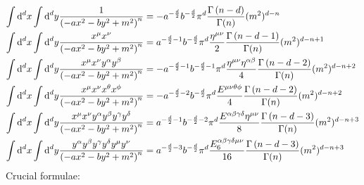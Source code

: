 \begin{align}
	\int \text{d} ^d x \int \text{d} ^d y \frac{1}{\left(-ax^2-by^2+m^2\right)^n} 
	&=
	-a^{-\frac{d}{2}}b^{-\frac{d}{2}}\pi^d \frac{\Gamma\left(n-d\right)}{\Gamma(n)}(m^2)^{d-n}
	\\
	\int \text{d} ^d x \int \text{d} ^d y \frac{x^\mu x^\nu}{\left(-ax^2-by^2+m^2\right)^n}
	&=
	a^{-\frac{d}{2}-1}b^{-\frac{d}{2}}\pi^d\frac{\eta^{\mu \nu}}{2} \frac{\Gamma\left(n-d-1\right)}{\Gamma(n)}(m^2)^{d-n+1}
	\\
	\int \text{d} ^d x \int \text{d} ^d y \frac{x^\mu x^\nu y^\alpha y^\beta}{\left(-ax^2-by^2+m^2\right)^n}
	&=
	-a^{-\frac{d}{2}-1}b^{-\frac{d}{2}-1}\pi^d\frac{\eta^{\mu \nu}\eta^{\alpha \beta}}{4} \frac{\Gamma\left(n-d-2\right)}{\Gamma(n)}(m^2)^{d-n+2}
	\\
	\int \text{d} ^d x \int \text{d} ^d y \frac{x^\mu x^\nu x^\theta x^\phi}{\left(-ax^2-by^2+m^2\right)^n}
	&=
	-a^{-\frac{d}{2}-2}b^{-\frac{d}{2}}\pi^d\frac{E^{\mu \nu \theta \phi }}{4} \frac{\Gamma\left(n-d-2\right)}{\Gamma(n)}(m^2)^{d-n+2}
	\\
	\int \text{d} ^d x \int \text{d} ^d y \frac{x^\mu x^\nu y^\alpha y^\beta y^\gamma y^\delta }{\left(-ax^2-by^2+m^2\right)^n}
	&=
	a^{-\frac{d}{2}-1}b^{-\frac{d}{2}-2}\pi^d\frac{E^{\alpha \beta \gamma \delta}\eta^{\mu \nu} }{8} \frac{\Gamma\left(n-d-3\right)}{\Gamma(n)}(m^2)^{d-n+3}
	\\
	\int \text{d} ^d x \int \text{d} ^d y \frac{y^\alpha y^\beta y^\gamma y^\delta y^\mu y^\nu }{\left(-ax^2-by^2+m^2\right)^n}
	&=
	a^{-\frac{d}{2}-3}b^{-\frac{d}{2}}\pi^d\frac{E_6^{\alpha \beta \gamma \delta \mu \nu}}{16} \frac{\Gamma\left(n-d-3\right)}{\Gamma(n)}(m^2)^{d-n+3}
\end{align}
Crucial formulae:

